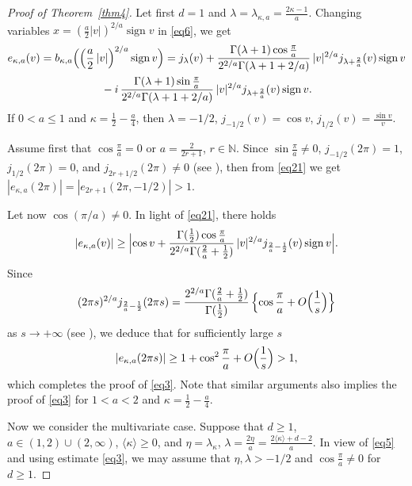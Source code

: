 \documentclass[12pt,twoside,reqno]{amsart}\usepackage[cp1251]{inputenc}
\theoremstyle{plain}
\theoremstyle{remark}
\newcommand\sign{\operatorname{sign}}
\begin{document}

\begin{proof}[Proof of Theorem~\ref{thm4}] Let first $d=1$ and $\lambda=\lambda_{\kappa,a}=\frac{2\kappa-1}{a}$. Changing variables $x=(\frac{a}{2}|v|)^{2/a}\sign{}v$
in \eqref{eq6}, we get
\begin{multline}\label{eq21}
e_{\kappa,a}(v)=b_{\kappa,a}\Bigl(\Bigl(\frac{a}{2}\,|v|\Bigr)^{2/a}\sign{}v\Bigr)
=j_{\lambda}(v)+\frac{\Gamma(\lambda+1)\cos\frac{\pi}{a}}{2^{2/a}\Gamma(\lambda+1+2/a)}\,
|v|^{2/a}j_{\lambda+\frac{2}{a}}(v)\sign{}v
\\
{}-i\,\frac{\Gamma(\lambda+1)\sin\frac{\pi}{a}}{2^{2/a}\Gamma(\lambda+1+2/a)}\,
|v|^{2/a}j_{\lambda+\frac{2}{a}}(v)\sign{}v.
\end{multline}
If $0<a\le 1$ and $\kappa=\frac{1}{2}-\frac{a}{4}$, then $\lambda=-1/2$, $j_{-1/2}(v)=\cos v$, $j_{1/2}(v)=\frac{\sin v}{v}$.

Assume first that $\cos\frac{\pi}{a}=0$ or $a=\frac{2}{2r+1}$, $r\in\mathbb{N}$. Since $\sin\frac{\pi}{a}\neq 0$, $j_{-1/2}(2\pi)=1$, $j_{1/2}(2\pi)=0$, and $j_{2r+1/2}(2\pi)\neq 0$ (see \cite[Chapt. 15, 15.28]{Wa66}), then from \eqref{eq21} we get $|e_{\kappa,a}(2\pi)|=|e_{2r+1}(2\pi,-1/2)|>1$.

Let now  $\cos{}(\pi/a)\neq 0$. In light of \eqref{eq21}, there holds %
\[
|e_{\kappa,a}(v)|\ge \Bigl|\cos v+\frac{\Gamma(\frac{1}{2})\cos\frac{\pi}{a}}{2^{2/a}\Gamma(\frac{2}{a}+\frac{1}{2})}\,
|v|^{2/a}j_{\frac{2}{a}-\frac{1}{2}}(v)\sign{}v\Bigr|.
\]
Since
\[
(2\pi s)^{2/a}j_{\frac{2}{a}-\frac{1}{2}}(2\pi s)=\frac{2^{2/a}\Gamma(\frac{2}{a}+\frac{1}{2})}{\Gamma(\frac{1}{2})}\,
\Bigl\{\cos\frac{\pi}{a}+O\Bigl(\frac{1}{s}\Bigr)\Bigr\}
\]
as $s\to +\infty$
(see \cite[Chapt.~VII, 7.1]{Wa66}), we deduce that for sufficiently large $s$
\[
|e_{\kappa,a}(2\pi s)|\ge 1+\cos^2\frac{\pi}{a}+O\Bigl(\frac{1}{s}\Bigr)>1,
\]
which completes the proof of  \eqref{eq3}. Note that similar arguments also implies the proof of \eqref{eq3} for  $1<a<2$ and $\kappa=\frac{1}{2}-\frac{a}{4}$.



\smallbreak
Now we consider the multivariate case. Suppose that  $d\ge 1$, $a\in (1,2)\cup (2,\infty)$, $\langle\kappa\rangle\ge 0$, and $\eta=\lambda_{\kappa}$, $\lambda=\frac{2\eta}{a}=\frac{2\langle\kappa\rangle+d-2}{a}$. In view of \eqref{eq5} and using estimate \eqref{eq3},  we may assume that  $\eta,\lambda>-1/2$ and $\cos\frac{\pi}{a}\neq 0$ for $d\ge 1$.


\end{proof}
\end{document}
